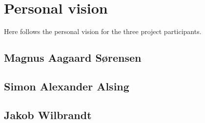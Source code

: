 
\chapter{Personal vision}
Here follows the personal vision for the three project participants.

\section{Magnus Aagaard Sørensen}

\section{Simon Alexander Alsing}

\section{Jakob Wilbrandt}
